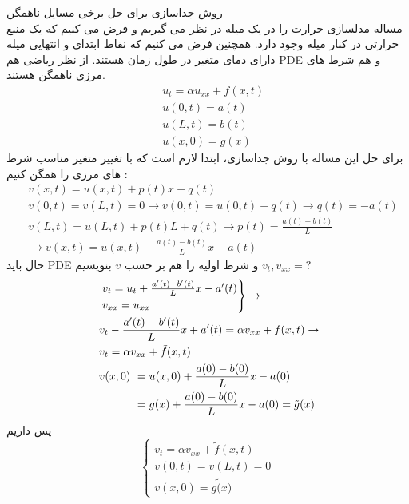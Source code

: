 روش جداسازی برای حل برخی مسایل ناهمگن\\
مساله مدلسازی حرارت را در یک میله در نظر می گیریم
و فرض می کنیم که یک منبع حرارتی در کنار میله وجود دارد. همچنین فرض می کنیم که نقاط ابتدای و انتهایی میله دارای دمای متغیر در طول زمان هستند. از نظر ریاضی هم PDE و هم شرط های مرزی ناهمگن هستند.
\begin{equation*}
	\begin{aligned}
		{} &\
		u_t=\alpha u_{xx}+f(x,t)
		\\ &\
		u(0,t)=a(t)
		\\ &\
		u(L,t)=b(t)
		\\ &\
		u(x,0)=g(x)
	\end{aligned}
\end{equation*}
برای حل این مساله با روش جداسازی، ابتدا لازم است که با تغییر متغیر مناسب شرط های مرزی را همگن کنیم :
\begin{equation*}
	\begin{aligned}
		{} &\
		v(x,t)=u(x,t)+p(t)x+q(t)
		\\ &\
		v(0,t)=v(L,t)=0\rightarrow
		v(0,t)=u(0,t)+q(t) \rightarrow q(t)=-a(t)
		\\ &\
		v(L,t)=u(L,t)+p(t)L+q(t)\rightarrow p(t)=\frac{a(t)-b(t)}{L}
		\\ &\
		\rightarrow v(x,t)=u(x,t)+\frac{a(t)-b(t)}{L}x-a(t)
	\end{aligned}
\end{equation*}
حال باید PDE و شرط اولیه را هم بر حسب
$v$
بنویسیم
$v_t,v_{xx}=?$
\begin{equation*}
	\begin{aligned}
		{} &\
		\begin{rcases}
			v_t=u_t+\frac{a^\prime(t)-b^\prime(t)}Lx-a^\prime(t)\\
			v_{xx}=u_{xx}
		\end{rcases}
		\rightarrow \\ &\
		v_t-\frac{a^\prime(t)-b^\prime(t)}Lx+a^\prime(t)=\alpha v_{xx}+f(x,t)\rightarrow \\ &\
		v_t=\alpha v_{xx}+\tilde{f}(x,t) \\ &\
		\begin{aligned}
			v(x,0) {} &\ =u(x,0)+\frac{a(0)-b(0)}{L}x-a(0)
			\\ &\
			= g(x)+\frac{a(0)-b(0)}{L}x-a(0)=\tilde{g}(x)
		\end{aligned}
	\end{aligned}
\end{equation*}
پس داریم
\begin{equation*}
	\begin{cases}
		v_t=\alpha v_{xx}+\tilde{f}(x,t)\\
		v(0,t)=v(L,t)=0\\
		v(x,0)=g\tilde(x)
	\end{cases}
\end{equation*}
